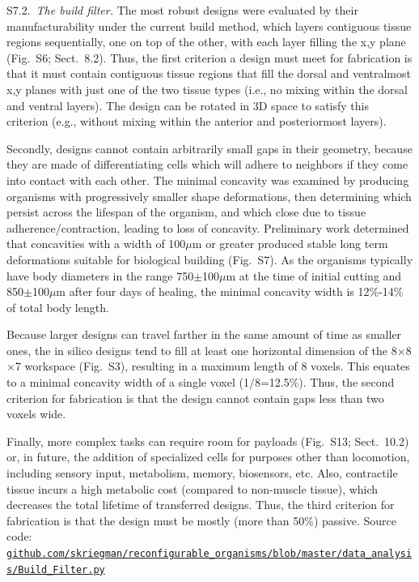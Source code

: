 \vspace{1em} 


S7.2.~\textit{The build filter.}
The most robust designs were evaluated by their manufacturability under the current build method, which layers contiguous tissue regions sequentially, one on top of the other, with each layer filling the x,y plane (Fig.~S6; Sect.~8.2). Thus, the first criterion a design must meet for fabrication is that it must contain contiguous tissue regions that fill the dorsal and ventralmost x,y planes with just one of the two tissue types (i.e., no mixing within the dorsal and ventral layers). The design can be rotated in 3D space to satisfy this criterion (e.g., without mixing within the anterior and posteriormost layers). 

Secondly, designs cannot contain arbitrarily small gaps in their geometry, because they are made of differentiating cells which will adhere to neighbors if they come into contact with each other. 
The minimal concavity was examined by producing organisms with progressively smaller shape deformations, then determining which persist across the lifespan of the organism, and which close due to tissue adherence/contraction, leading to loss of concavity. 
Preliminary work determined that concavities with a width of 100{$\mu$}m or greater produced stable long term deformations suitable for biological building (Fig.~S7). 
As the organisms typically have body diameters in the range 750{$\pm$}100{$\mu$}m at the time of initial cutting and 850{$\pm$}100{$\mu$}m after four days of healing, the minimal concavity width is 12\%-14\% of total body length. 

Because larger designs can travel farther in the same amount of time as smaller ones, the in silico designs tend to fill at least one horizontal dimension of the 8{$\times$}8{$\times$}7 workspace (Fig.~S3), resulting in a maximum length of 8 voxels. 
This equates to a minimal concavity width of a single voxel (1/8=12.5\%). Thus, the second criterion for fabrication is that the design cannot contain gaps less than two voxels wide.

Finally, more complex tasks can require room for payloads (Fig.~S13; Sect.~10.2) or, in future, the addition of specialized cells for purposes other than locomotion, including sensory input, metabolism, memory, biosensors, etc. 
Also, contractile tissue incurs a high metabolic cost (compared to non-muscle tissue), which decreases the total lifetime of transferred designs. 
Thus, the third criterion for fabrication is that the design must be mostly (more than 50\%) passive.
Source code: \\
\href{https://github.com/skriegman/reconfigurable_organisms/blob/master/data_analysis/Build_Filter.py}{\scriptsize\tt\color{blue}github.com/skriegman/reconfigurable\_organisms/blob/master/data\_analysis/Build\_Filter.py}

